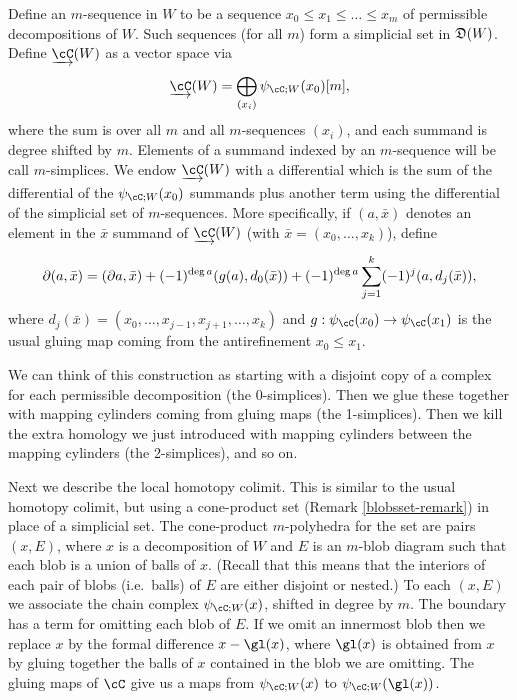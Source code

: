 Define an $m$-sequence in $W$ to be a sequence $x_0 \le x_1 \le \dots \le x_m$ of permissible decompositions of $W$.
Such sequences (for all $m$) form a simplicial set in $\mathfrak{D}(W)$.
Define $\cl{\cC}(W)$ as a vector space via
\[
	\cl{\cC}(W) = \bigoplus_{(x_i)} \psi_{\cC;W}(x_0)[m] ,
\]
where the sum is over all $m$ and all $m$-sequences $(x_i)$, and each summand is degree shifted by $m$. 
Elements of a summand indexed by an $m$-sequence will be call $m$-simplices.
We endow $\cl{\cC}(W)$ with a differential which is the sum of the differential of the $\psi_{\cC;W}(x_0)$
summands plus another term using the differential of the simplicial set of $m$-sequences.
More specifically, if $(a, \bar{x})$ denotes an element in the $\bar{x}$
summand of $\cl{\cC}(W)$ (with $\bar{x} = (x_0,\dots,x_k)$), define
\[
	\partial (a, \bar{x}) = (\partial a, \bar{x}) + (-1)^{\deg{a}} (g(a), d_0(\bar{x})) + (-1)^{\deg{a}} \sum_{j=1}^k (-1)^{j} (a, d_j(\bar{x})) ,
\]
where $d_j(\bar{x}) = (x_0,\dots,x_{j-1},x_{j+1},\dots,x_k)$ and $g: \psi_\cC(x_0)\to \psi_\cC(x_1)$
is the usual gluing map coming from the antirefinement $x_0 \le x_1$.

We can think of this construction as starting with a disjoint copy of a complex for each
permissible decomposition (the 0-simplices).
Then we glue these together with mapping cylinders coming from gluing maps
(the 1-simplices).
Then we kill the extra homology we just introduced with mapping 
cylinders between the mapping cylinders (the 2-simplices), and so on.

Next we describe the local homotopy colimit.
This is similar to the usual homotopy colimit, but using
a cone-product set (Remark \ref{blobsset-remark}) in place of a simplicial set.
The cone-product $m$-polyhedra for the set are pairs $(x, E)$, where $x$ is a decomposition of $W$
and $E$ is an $m$-blob diagram such that each blob is a union of balls of $x$.
(Recall that this means that the interiors of
each pair of blobs (i.e.\ balls) of $E$ are either disjoint or nested.)
To each $(x, E)$ we associate the chain complex $\psi_{\cC;W}(x)$, shifted in degree by $m$.
The boundary has a term for omitting each blob of $E$.
If we omit an innermost blob then we replace $x$ by the formal difference $x - \gl(x)$, where
$\gl(x)$ is obtained from $x$ by gluing together the balls of $x$ contained in the blob we are omitting.
The gluing maps of $\cC$ give us a maps from $\psi_{\cC;W}(x)$ to $\psi_{\cC;W}(\gl(x))$.

